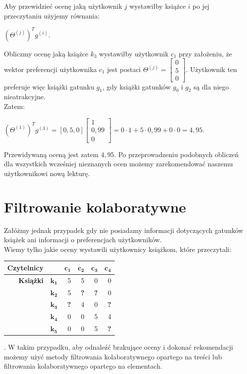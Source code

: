 \documentclass[12pt,a4paper]{report}
\begin{document}
{\\
\\Aby przewidzieć ocenę jaką użytkownik $j$ wystawiłby książce $i$ po jej przeczytaniu użyjemy równania:
\begin{center}
$(\Theta^{(j)})^T g^{(i)}$.
\end{center}
\bigskip
Obliczmy ocenę jaką książce $k_3$ wystawiłby użytkownik $c_1$ przy założeniu, że wektor preferencji użytkownika $c_1$ jest postaci $\Theta^{(j)}= \left[
        \begin{array}{c}
         0 \\
         5\\
         0
         \end{array}
      \right] $. Użytkownik ten preferuje więc książki gatunku $g_1$, gdy książki gatunków $g_0$ i $g_2$ są dla niego nieatrakcyjne.
\\Zatem:
\begin{center}
$(\Theta^{(1)})^T g^{(3)} = [0,5,0] \left[
        \begin{array}{c}
         1 \\
         0,99\\
         0
         \end{array}
      \right] = 0 \cdot 1 + 5 \cdot 0,99 + 0 \cdot 0 = 4,95$.
\end{center}
Przewidywaną oceną jest zatem $4,95$. Po przeprowadzeniu podobnych obliczeń dla wszystkich wcześniej nieznanych ocen możemy zarekomendować naszemu użytkownikowi nową lekturę.

\section*{Filtrowanie kolaboratywne}
Załóżmy jednak przypadek gdy nie posiadamy informacji dotyczących gatunków książek ani informacji o preferencjach użytkowników.
\\Wiemy tylko jakie oceny wystawili użytkownicy książkom, które przeczytali:
\begin{center}
\begin{tabular}{|r|r|r|r|r|r|} \hline
\textbf{Czytelnicy} & & $\mathbf{c_1}$ & $\mathbf{c_2}$ & $\mathbf{c_3}$ & $\mathbf{c_4}$ \\
\hline
\hline
\textbf{Książki} &$\mathbf{k_1}$ & 5 & 5 & 0 & 0 \\
\hline
&$\mathbf{k_2}$ & 5 & \textbf{?} & \textbf{?} & 0 \\
\hline
&$\mathbf{k_3}$ & \textbf{?} & 4 & 0 & \textbf{?} \\
\hline
&$\mathbf{k_4}$ & 0 & 0 & 5 & 4 \\
\hline
&$\mathbf{k_5}$ & 0 & 0 & 5 & \textbf{?} \\
\hline
\end{tabular}
\end{center}.
W takim przypadku, aby odnaleźć brakujące oceny i dokonać rekomendacji możemy użyć metody filtrowania kolaboratywnego opartego na treści lub filtrowania kolaboratywnego opartego na elementach.

}
\end{document}
